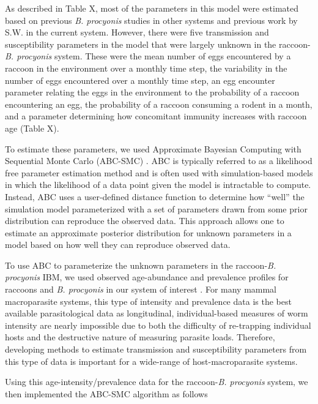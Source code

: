 \documentclass[11pt]{article}
\begin{document}
As described in Table X, most of the parameters in this model were
estimated based on previous \emph{B. procyonis} studies in other systems
and previous work by S.W. in the current system. However, there were
five transmission and susceptibility parameters in the model that were
largely unknown in the raccoon-\emph{B. procyonis} system. These were
the mean number of eggs encountered by a raccoon in the environment over
a monthly time step, the variability in the number of eggs encountered
over a monthly time step, an egg encounter parameter relating the eggs
in the environment to the probability of a raccoon encountering an egg,
the probability of a raccoon consuming a rodent in a month, and a
parameter determining how concomitant immunity increases with raccoon
age (Table X).

To estimate these parameters, we used Approximate Bayesian Computing
with Sequential Monte Carlo (ABC-SMC) \citep{Sisson2009,Beaumont2010,Kosmala2015}. ABC is typically referred to as a likelihood
free parameter estimation method and is often used with simulation-based
models in which the likelihood of a data point given the model is
intractable to compute. Instead, ABC uses a user-defined distance
function to determine how ``well'' the simulation model parameterized
with a set of parameters drawn from some prior distribution can
reproduce the observed data. This approach allows one to estimate an
approximate posterior distribution for unknown parameters in a model based
on how well they can reproduce observed data.

To use ABC to parameterize the unknown parameters in the
raccoon-\emph{B. procyonis} IBM, we used observed age-abundance and
prevalence profiles for raccoons and \emph{B. procyonis} in our system
of interest \citep{Weinstein2016}. For many mammal macroparasite
systems, this type of intensity and prevalence data is the best
available parasitological data as longitudinal, individual-based
measures of worm intensity are nearly impossible due to both the
difficulty of re-trapping individual hosts and the destructive nature of
measuring parasite loads.
Therefore, developing methods to estimate transmission and
susceptibility parameters from this type of data is important for a
wide-range of host-macroparasite systems.

Using this age-intensity/prevalence data for the raccoon-\emph{B.
procyonis} system, we then implemented the ABC-SMC algorithm as follows \citep{Sisson2009,Toni2009}
\end{document}
